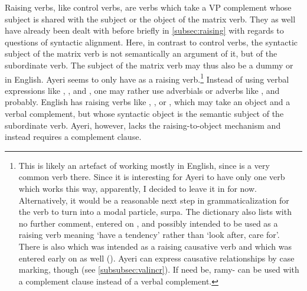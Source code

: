 Raising verbs, like control verbs, are verbs which take a VP complement whose
subject is shared with the subject or the object of the matrix verb. They as
well have already been dealt with before briefly in \autoref{subsec:raising} with
regards to questions of syntactic alignment. Here, in contrast to control verbs, the
syntactic subject of the matrix verb is not semantically an argument of it, but
of the subordinate verb. The subject of the matrix verb may thus also be a
dummy  or  in English. Ayeri seems to only have
 as a raising verb.\footnote{This is likely an
artefact of working mostly in English, since  is a very common verb
there. Since it is interesting for Ayeri to have only one verb which works this
way, apparently, I decided to leave it in for now. Alternatively, it would be a
reasonable next step in grammaticalization for the verb to turn into a modal
particle,  {surpa}. The dictionary also lists
 with no further comment, entered on
, and possibly intended to be used as a raising verb
meaning `have a tendency' rather than `look after, care for'. There is also
 which was intended as a raising causative
verb and which was entered early on as well (). Ayeri can
express causative relationships by case marking, though (see
\autoref{subsubsec:valincr}). If need be,  {ramy-} can be used with
a complement clause instead of a verbal complement.} Instead of using verbal
expressions like , , and , one may rather use
adverbials or adverbs like ,
 and  {probably}.
English has raising verbs like , , or , which may
take an object and a verbal complement, but whose syntactic object is the
semantic subject of the subordinate verb. Ayeri, however, lacks the
raising-to-object mechanism and instead requires a complement clause.

